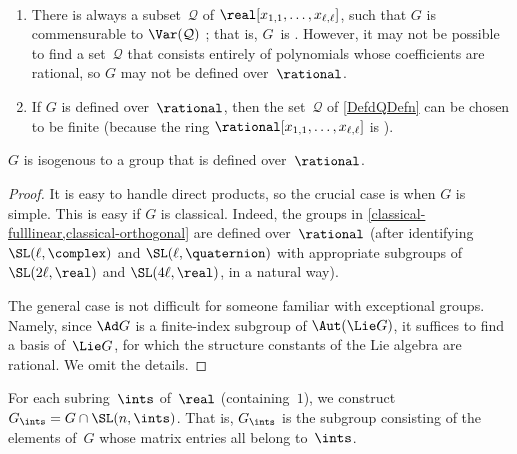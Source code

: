\begin{rems} \label{DefQRems}\ 
\noprelistbreak
 \begin{enumerate}
 \item
 There is always a subset~$\mathcal{Q}$ of $\real[x_{1,1},
\ldots, x_{\ell,\ell}]$, such that $G$ is commensurable to
$\Var(\mathcal{Q})$ ; that is, $G$~is
. However, it may not be possible to find a
set~$\mathcal{Q}$ that consists entirely of polynomials
whose coefficients are rational, so $G$ may not be defined
over~$\rational$.
 \item If $G$ is defined over~$\rational$, then the
set~$\mathcal{Q}$ of \cref{DefdQDefn} can be chosen to
be finite (because the ring $\rational[x_{1,1}, \ldots,
x_{\ell,\ell}]$ is ). 
 \end{enumerate}
 \end{rems}

\begin{prop} \label{hasQform}
 $G$ is isogenous to a group that is defined over\/~$\rational$.
 \end{prop}

\begin{proof}
 It is easy to handle direct products, so the crucial case
is when $G$ is simple. This is easy if $G$ is classical.
Indeed, the groups in \cref{classical-fulllinear,classical-orthogonal} are defined over~$\rational$
(after identifying $\SL(\ell,\complex)$ and
$\SL(\ell,\quaternion)$ with appropriate subgroups of
$\SL(2\ell,\real)$ and $\SL(4\ell,\real)$, in a natural
way). 

The general case is not difficult for someone familiar with
exceptional groups. Namely, since $\Ad G$ is a
finite-index subgroup of $\Aut(\Lie G)$,
it suffices to find a basis of~$\Lie G$, for which the
structure constants of the Lie algebra are rational. We omit the details.
 \end{proof}

\begin{notation} 
For each subring~$\ints$
of~$\real$ (containing~$1$), we construct
$G_{\ints} = G \cap
\SL(n,\ints)$. That is, $G_\ints$ is the subgroup consisting of
the elements of~$G$ whose matrix entries all belong to~$\ints$. 
 \end{notation}


